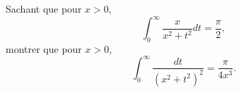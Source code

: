 

\begin{exercice}\label{exo_I-3-6}
Sachant que pour $x>0$,
\begin{equation}		\label{EqPredicI36}
	\int_0^{\infty}\frac{ x }{ x^2+t^2 }dt=\frac{ \pi }{ 2 },
\end{equation}
montrer que pour $x>0$,
\begin{equation}
	\int_0^{\infty}\frac{ dt }{ (x^2+t^2)^2 }=\frac{ \pi }{ 4x^3 }.
\end{equation}

\end{exercice}
